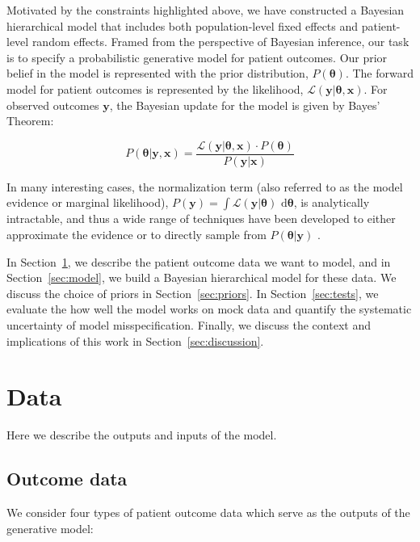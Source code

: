 \documentclass[twocolumn]{bmcart}%
\def\v#1{\bm{#1}}
\newcommand{\like}{\ensuremath{\mathcal{L}}}
\begin{document}
Motivated by the constraints highlighted above, we have constructed a Bayesian
hierarchical model that includes both population-level fixed effects and
patient-level random effects.  Framed from the perspective of Bayesian
inference, our task is to specify a probabilistic generative model for patient
outcomes.  Our prior belief in the model is represented with the prior
distribution, $P(\v \theta)$.
The forward model for patient outcomes is represented by the likelihood,
$\like(\v y | \v\theta, \v x)$.
For observed outcomes $\v y$,
the Bayesian update for the model is given by Bayes' Theorem:

\begin{equation}
  \label{eq:bayes}
  P(\v\theta | \v y, \v x) = \frac{\like(\v y | \v\theta, \v x) \cdot P(\v\theta)}{P(\v y | \v x)}
\end{equation}

In many interesting cases, the normalization term (also referred to as the
model evidence or marginal likelihood),
$P(\v y) = \int \like(\v y | \v\theta) \text{ d}\v\theta$,
is analytically intractable, and thus a wide range of techniques have been
developed to either approximate the evidence or to directly sample from
$P(\v\theta | \v y)$
\citep[e.g.,][]{metropolis1949, gilks1992, skilling2004, betancourt2017}.

In Section~\ref{sec:data}, we describe the patient outcome data we want to
model, and in Section~\ref{sec:model}, we build a Bayesian hierarchical model
for these data.  We discuss the choice of priors in Section~\ref{sec:priors}.
In Section~\ref{sec:tests}, we evaluate the how well the model works on mock
data and quantify the systematic uncertainty of model misspecification.
Finally, we discuss the context and implications of this work in
Section~\ref{sec:discussion}.

\section{Data}\label{sec:data}

Here we describe the outputs and inputs of the model.

\subsection{Outcome data}\label{sec:data-outcome}

We consider four types of patient outcome data which serve as the outputs of
the generative model:
\end{document}
